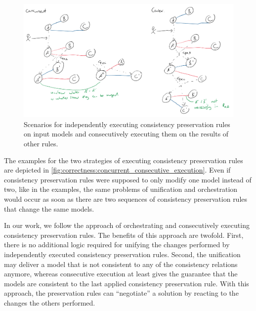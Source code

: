 \begin{figure}
    \centering
    \includegraphics[width=\textwidth]{figures/correctness/formal/concurrent_consecutive_execution.png}
    \caption[Execution alternatives of consistency preservation rules]{Scenarios for independently executing consistency preservation rules on input models and consecutively executing them on the results of other rules.}
    \label{fig:correctness:concurrent_consecutive_execution}
\end{figure}

The examples for the two strategies of executing \glspl{consistency preservation rule} are depicted in \autoref{fig:correctness:concurrent_consecutive_execution}. 
Even if \glspl{consistency preservation rule} were supposed to only modify one model instead of two, like in the examples, the same problems of unification and orchestration would occur as soon as there are two sequences of \glspl{consistency preservation rule} that change the same models.

In our work, we follow the approach of orchestrating and consecutively executing \glspl{consistency preservation rule}.
The benefits of this approach are twofold. First, there is no additional logic required for unifying the changes performed by independently executed \glspl{consistency preservation rule}. 
Second, the unification may deliver a model that is not consistent to any of the \glspl{consistency relation} anymore, whereas consecutive execution at least gives the guarantee that the models are consistent to the last applied \gls{consistency preservation rule}.
With this approach, the preservation rules can \enquote{negotiate} a solution by reacting to the changes the others performed.

